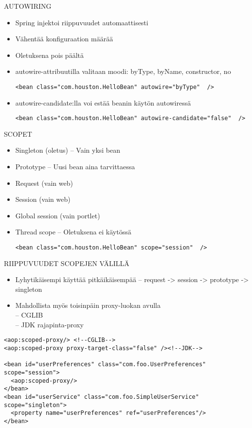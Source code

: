 \documentclass[hyperref={pdfauthor=\AUTHOR},14pt]{beamer}
\begin{document}
\begin{frame}[t, fragile]{AUTOWIRING}
\begin{itemize}
 \item Spring injektoi riippuvuudet automaattisesti
 \item Vähentää konfiguraation määrää
 \item Oletuksena pois päältä
 \item autowire-attribuutilla valitaan moodi:
   byType, byName, constructor, no
\begin{lstlisting}
<bean class="com.houston.HelloBean" autowire="byType"  />
\end{lstlisting}
 \item autowire-candidate:lla voi estää beanin käytön autowiressä
\begin{lstlisting}
<bean class="com.houston.HelloBean" autowire-candidate="false"  />
\end{lstlisting}
\end{itemize}
\end{frame}
\begin{frame}[t, fragile]{SCOPET}
\begin{itemize}
 \item Singleton (oletus)
 -- Vain yksi bean
 \item Prototype
 -- Uusi bean aina tarvittaessa
 \item Request (vain web)
 \item Session (vain web)
 \item Global session (vain portlet)
 \item Thread scope
 -- Oletuksena ei käytössä
\begin{lstlisting}
<bean class="com.houston.HelloBean" scope="session"  />
\end{lstlisting}
\end{itemize}
\end{frame}
\begin{frame}[t, fragile]{RIIPPUVUUDET SCOPEJEN VÄLILLÄ}
\begin{itemize}
 \item Lyhytikäisempi käyttää pitkäikäisempää
 -- request -> session -> prototype -> singleton
 \item Mahdollista myös toisinpäin proxy-luokan avulla\\
 -- CGLIB \\
 -- JDK rajapinta-proxy     
\end{itemize}
\begin{lstlisting}
<aop:scoped-proxy/> <!--CGLIB-->
<aop:scoped-proxy proxy-target-class="false" /><!--JDK-->

<bean id="userPreferences" class="com.foo.UserPreferences" scope="session">
  <aop:scoped-proxy/>
</bean>
<bean id="userService" class="com.foo.SimpleUserService" scope="singleton">
  <property name="userPreferences" ref="userPreferences"/>
</bean>
\end{lstlisting}

\end{frame}
\end{document}
